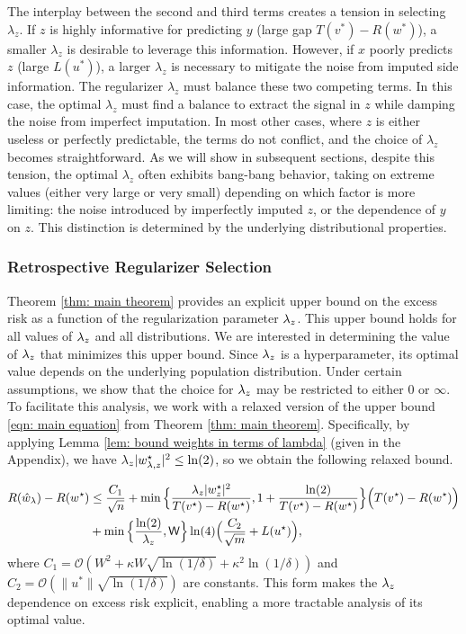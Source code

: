 The interplay between the second and third terms creates a tension in selecting $\lambda_z$. If $z$ is highly informative for predicting $y$ (large gap $T(v^*) - R(w^*)$), a smaller $\lambda_z$ is desirable to leverage this information. However, if $x$ poorly predicts $z$ (large $L(u^*)$), a larger $\lambda_z$ is necessary to mitigate the noise from imputed side information. The regularizer $\lambda_z$ must balance these two competing terms. In this case, the optimal $\lambda_z$ must find a balance to extract the signal in $z$ while damping the noise from imperfect imputation. In most other cases, where $z$ is either useless or perfectly predictable, the terms do not conflict, and the choice of $\lambda_z$ becomes straightforward. As we will show in subsequent sections, despite this tension, the optimal $\lambda_z$ often exhibits bang-bang behavior, taking on extreme values (either very large or very small) depending on which factor is more limiting: the noise introduced by imperfectly imputed $z$, or the dependence of $y$ on $z$. This distinction is determined by the underlying distributional properties.

\subsubsection{Retrospective Regularizer Selection}

Theorem \ref{thm: main theorem} provides an explicit upper bound on the excess risk as a function of the regularization parameter $\lambda_z$. This upper bound holds for all values of $\lambda_z$ and all distributions. We are interested in determining the value of $\lambda_z$ that minimizes this upper bound. Since $\lambda_z$ is a hyperparameter, its optimal value depends on the underlying population distribution. Under certain assumptions, we show that the choice for $\lambda_z$ may be restricted to either $0$ or $\infty$.
To facilitate this analysis, we work with a relaxed version of the upper bound \eqref{eqn: main equation} from Theorem \ref{thm: main theorem}. Specifically, by applying Lemma \ref{lem: bound weights in terms of lambda} (given in the Appendix), we have $\lambda_z |w^\star_{{\lambda,z}}|^2 \leq \ln(2)$, so we obtain the following relaxed bound.




\begin{equation}\label{eqn: weaker main equation}
    \begin{aligned}
        R(\hat{w}_\lambda) - R(w^\star) &\leq \frac{C_1}{\sqrt{n}} +
        \min\Big\{\frac{\lambda_z|w^\star_z|^2}{T(v^\star) - R(w^\star)},1+\frac{\ln(2)}{T(v^\star) - R(w^\star)}\Big\}\Big(T(v^\star) - R(w^\star)\Big) \\
        &+
        \min\Big\{\frac{\ln(2)}{\lambda_z},\mathsf{W}\Big\}\ln(4)\Big(\frac{C_2}{\sqrt{m}} + L(u^\star)\Big),
    \end{aligned}
\end{equation}
where $C_1 = \mathcal{O}\left( W^2 + \kappa W \sqrt{\ln(1/\delta)} + \kappa^2 \ln(1/\delta) \right)$ and $C_2 = \mathcal{O}\left( \|u^*\| \sqrt{\ln(1/\delta)} \right)$ are constants. This form makes the $\lambda_z$ dependence on excess risk explicit, enabling a more tractable analysis of its optimal value.

